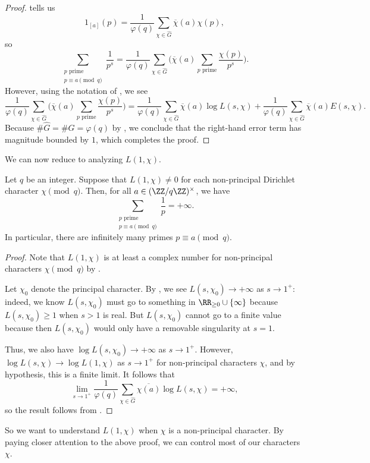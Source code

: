 \documentclass[../notes.tex]{subfiles}
\begin{document}
\begin{proof}
	 tells us
	\[1_{[a]}(p)=\frac1{\varphi(q)}\sum_{\chi\in\widehat G}\overline\chi(a)\chi(p),\]
	so
	\[\sum_{\substack{p\text{ prime}\\p\equiv a\pmod q}}\frac1{p^s}=\frac1{\varphi(q)}\sum_{\chi\in\widehat G}\Bigg(\overline\chi(a)\sum_{p\text{ prime}}\frac{\chi(p)}{p^s}\Bigg).\]
	However, using the notation of , we see
	\[\frac1{\varphi(q)}\sum_{\chi\in\widehat G}\Bigg(\overline\chi(a)\sum_{p\text{ prime}}\frac{\chi(p)}{p^s}\Bigg)=\frac1{\varphi(q)}\sum_{\chi\in\widehat G}\overline\chi(a)\log L(s,\chi)+\frac1{\varphi(q)}\sum_{\chi\in\widehat G}\overline\chi(a)E(s,\chi).\]
	Because $\#\widehat G=\#G=\varphi(q)$ by , we conclude that the right-hand error term has magnitude bounded by $1$, which completes the proof.
\end{proof}
We can now reduce  to analyzing $L(1,\chi)$.
\begin{proposition} \label{prop:reduce-dir-to-l}
	Let $q$ be an integer. Suppose that $L(1,\chi)\ne0$ for each non-principal Dirichlet character $\chi\pmod q$. Then, for all $a\in(\ZZ/q\ZZ)^\times$, we have
	\[\sum_{\substack{p\text{ prime}\\p\equiv a\pmod q}}\frac1{p}=+\infty.\]
	In particular, there are infinitely many primes $p\equiv a\pmod q$.
\end{proposition}
\begin{proof}
	Note that $L(1,\chi)$ is at least a complex number for non-principal characters $\chi\pmod q$ by .

	Let $\chi_0$ denote the principal character. By , we see $L(s,\chi_0)\to+\infty$ as $s\to1^+$: indeed, we know $L(s,\chi_0)$ must go to something in $\RR_{\ge0}\cup\{\infty\}$ because $L(s,\chi_0)\ge1$ when $s>1$ is real. But $L(s,\chi_0)$ cannot go to a finite value because then $L(s,\chi_0)$ would only have a removable singularity at $s=1$.

	Thus, we also have $\log L(s,\chi_0)\to+\infty$ as $s\to1^+$. However, $\log L(s,\chi)\to\log L(1,\chi)$ as $s\to1^+$ for non-principal characters $\chi$, and by hypothesis, this is a finite limit. It follows that
	\[\lim_{s\to1^+}\frac1{\varphi(q)}\sum_{\chi\in\widehat G}\overline{\chi(a)}\log L(s,\chi)=+\infty,\]
	so the result follows from .
\end{proof}
So we want to understand $L(1,\chi)$ when $\chi$ is a non-principal character. By paying closer attention to the above proof, we can control most of our characters $\chi$.
\end{document}
